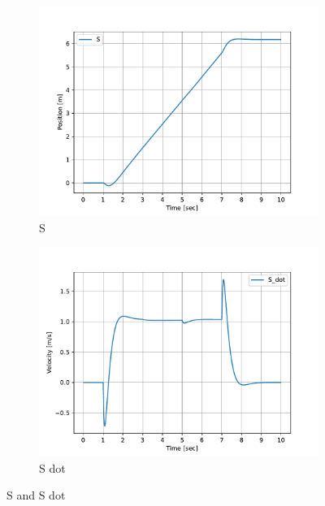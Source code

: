 \begin{figure}[h]
	\centering
	\begin{subfigure}[t]{0.45\textwidth}
		\includegraphics[width=\textwidth]{S}
		\caption{S}
		\label{fig:S}
	\end{subfigure}
	\begin{subfigure}[t]{0.45\textwidth}
		\includegraphics[width=\textwidth]{S_dot}
		\caption{S dot}
		\label{fig:S dot}
	\end{subfigure}
	\caption{S and S dot}
	\label{fig:S and S dot}
\end{figure}

